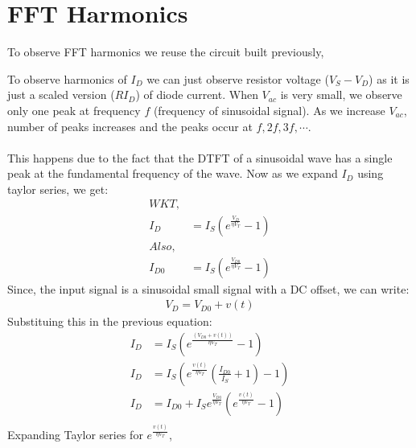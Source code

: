 \documentclass[12pt,a4paper]{article}
\begin{document}
\section{FFT Harmonics}
To observe FFT harmonics we reuse the circuit built previously,
\begin{figure}[!ht]
\centering
{}%
\end{figure}
\newline To observe harmonics of $I_D$ we can just observe resistor voltage ($V_S-V_D$) as it is just a scaled version ($RI_D$) of diode current. When $V_{ac}$ is very small, we observe only one peak at frequency $f$ (frequency of sinusoidal signal). As we increase $V_{ac}$, number of peaks increases and the peaks occur at $f, 2f, 3f, \cdots$.\\\\
This happens due to the fact that the DTFT of a sinusoidal wave has a single peak at the fundamental frequency of the wave. Now as we expand $I_D$ using taylor series, we get:
\begin{align*}
    WKT,\\
    I_D &= I_S(e^{\frac{V_D}{\eta V_T}} - 1)\\
    Also,\\
    I_{D0} &= I_S(e^{\frac{V_{D0}}{\eta V_T}} - 1)
\end{align*}
Since, the input signal is a sinusoidal small signal with a DC offset, we can write:
\begin{align*}
    V_D = V_{D0} + v(t)
\end{align*}
Substituing this in the previous equation:
\begin{align*}
    I_D &= I_S(e^{\frac{(V_{D0} + v(t))}{\eta V_T}} - 1)\\
    I_D &= I_S(e^{\frac{v(t)}{\eta V_T}}(\frac{I_{D0}}{I_S} + 1) - 1)\\
    I_D &= I_{D0} + I_Se^{\frac{V_{D0}}{\eta V_T}}(e^{\frac{v(t)}{\eta V_T}} - 1)\\
\end{align*}
Expanding Taylor series for $e^{\frac{v(t)}{\eta V_T}}$,
\end{document}
